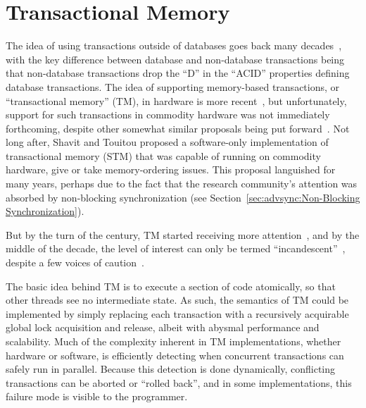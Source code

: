 
\section{Transactional Memory}
\label{sec:future:Transactional Memory}

The idea of using transactions outside of databases goes back many
decades~\cite{DBLomet1977SIGSOFT}, with the key difference between
database and non-database transactions being that non-database transactions
drop the ``D'' in the ``ACID'' properties defining database transactions.
The idea of supporting memory-based transactions, or ``transactional memory''
(TM), in hardware
is more recent~\cite{Herlihy93a}, but unfortunately, support for such
transactions in commodity hardware was not immediately forthcoming,
despite other somewhat similar proposals being put forward~\cite{JMStone93}.
Not long after, Shavit and Touitou proposed a software-only implementation
of transactional memory (STM) that was capable of running on commodity
hardware, give or take memory-ordering issues.
This proposal languished for many years, perhaps due to the fact that
the research community's attention was absorbed by non-blocking
synchronization (see Section~\ref{sec:advsync:Non-Blocking Synchronization}).

But by the turn of the century, TM started receiving
more attention~\cite{Martinez01a,Rajwar01a}, and by the middle of the
decade, the level of interest can only be termed
``incandescent''~\cite{MauriceHerlihy2005-TM-manifesto.pldi,
DanGrossman2007TMGCAnalogy}, despite a few voices of
caution~\cite{Blundell2005DebunkTM,McKenney2007PLOSTM}.

The basic idea behind TM is to execute a section of
code atomically, so that other threads see no intermediate state.
As such, the semantics of TM could be implemented
by simply replacing each transaction with a recursively acquirable
global lock acquisition and release, albeit with abysmal performance
and scalability.
Much of the complexity inherent in TM implementations, whether hardware
or software, is efficiently detecting when concurrent transactions can safely
run in parallel.
Because this detection is done dynamically, conflicting transactions
can be aborted or ``rolled back'', and in some implementations, this
failure mode is visible to the programmer.

